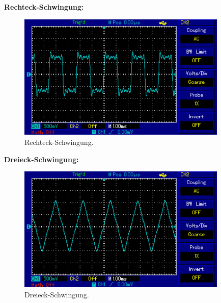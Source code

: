 \textbf{Rechteck-Schwingung:} \\
\begin{figure}[H]
  \centering
  \includegraphics[height=6cm]{picture/Rechteck.PNG}
  \caption{Rechteck-Schwingung.}
  \label{fig:Recht}
\end{figure}

\textbf{Dreieck-Schwingung:} \\
\begin{figure}[H]
  \centering
  \includegraphics[height=6cm]{picture/Dreieck.PNG}
  \caption{Dreieck-Schwingung.}
  \label{fig:Drei}
\end{figure}

